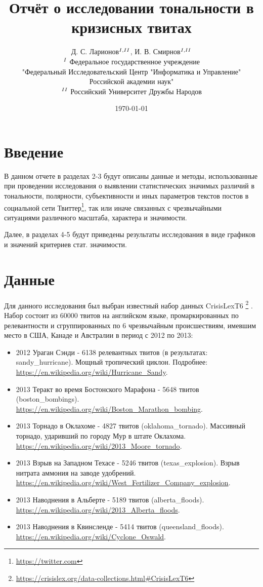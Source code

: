 \documentclass[11pt]{article}
\title{Отчёт о исследовании тональности в кризисных твитах}
\author{
        Д. С. Ларионов$^{\rom{1}, \rom{2}}$, И. В. Смирнов$^{\rom{1}, \rom{2}}$\\
        $^{\rom{1}}$ Федеральное государственное учреждение \\"Федеральный Исследовательский Центр "Информатика и Управление"\\ Российской академии наук" \\
        $^{\rom{2}}$ Российский Университет Дружбы Народов
}
\date{\today}
\renewenvironment{abstract}
    {\par\noindent\textbf{\abstractname.}\ \ignorespaces}
\newcommand{\keywords}[1]
    {\par\noindent\textbf{Ключевые слова:} #1}
\begin{document}
\maketitle
\newpage
\tableofcontents
\newpage



\section{Введение}
\par В данном отчете в разделах 2-3 будут описаны данные и методы, использованные при проведении исследования о выявлении статистических значимых различий в тональности, полярности, субъективности и иных параметров текстов постов в социальной сети Твиттер\footnote{\url{https://twitter.com}}, так или иначе связанных с чрезвычайными ситуациями различного масштаба, характера и значимости.
\par Далее, в разделах 4-5 будут приведены результаты исследования в виде графиков и значений критериев стат. значимости.

\section{Данные}

Для данного исследования был выбран известный набор данных CrisisLexT6 \footnote{\url{https://crisislex.org/data-collections.html#CrisisLexT6}} \cite{olteanu2014crisislex}.  Набор состоит из 60000 твитов на английском языке, промаркированных по релевантности и сгруппированных по 6 чрезвычайным происшествиям, имевшим место в США, Канаде и Австралии в период с 2012 по 2013:
\begin{itemize}
    \item 2012 Ураган Сэнди - 6138 релевантных твитов (в результатах: sandy\_hurricane). Мощный тропический циклон. Подробнее: \url{https://en.wikipedia.org/wiki/Hurricane_Sandy}.
    \item 2013 Теракт во время Бостонского Марафона  - 5648 твитов  (boston\_bombings). \url{https://en.wikipedia.org/wiki/Boston_Marathon_bombing}.
    \item 2013 Торнадо в Оклахоме - 4827 твитов (oklahoma\_tornado). Массивный торнадо, ударивший по городу Мур в штате Оклахома. \url{https://en.wikipedia.org/wiki/2013_Moore_tornado}.
    \item 2013 Взрыв на Западном Техасе - 5246 твитов  (texas\_explosion). Взрыв нитрата аммония на заводе удобрений. \url{https://en.wikipedia.org/wiki/West_Fertilizer_Company_explosion}.
    \item 2013 Наводнения в Альберте - 5189 твитов (alberta\_floods). \url{https://en.wikipedia.org/wiki/2013_Alberta_floods}.
    \item 2013 Наводнения в Квинсленде - 5414 твитов (queensland\_floods). \url{https://en.wikipedia.org/wiki/Cyclone_Oswald}.
    
\end{itemize}
\end{document}
